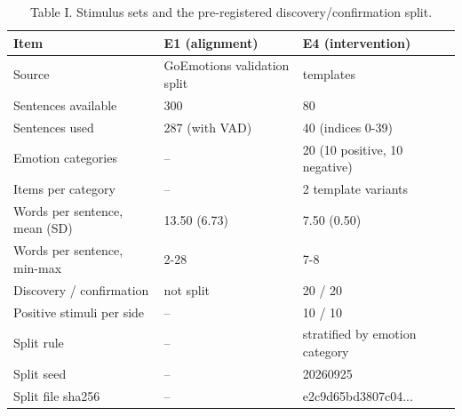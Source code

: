 \begin{table}[t]
\centering
\caption{Table I. Stimulus sets and the pre-registered discovery/confirmation split.}
\label{tab:i}
\begin{tabular}{lll}
\toprule
Item & E1 (alignment) & E4 (intervention) \\
\midrule
Source & GoEmotions validation split & templates \\
Sentences available & 300 & 80 \\
Sentences used & 287 (with VAD) & 40 (indices 0-39) \\
Emotion categories & -- & 20 (10 positive, 10 negative) \\
Items per category & -- & 2 template variants \\
Words per sentence, mean (SD) & 13.50 (6.73) & 7.50 (0.50) \\
Words per sentence, min-max & 2-28 & 7-8 \\
Discovery / confirmation & not split & 20 / 20 \\
Positive stimuli per side & -- & 10 / 10 \\
Split rule & -- & stratified by emotion category \\
Split seed & -- & 20260925 \\
Split file sha256 & -- & e2c9d65bd3807c04... \\
\bottomrule
\end{tabular}
\end{table}